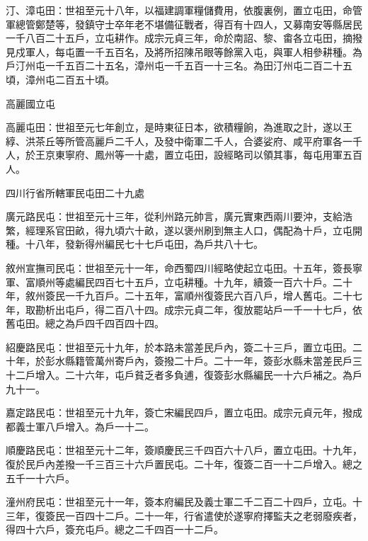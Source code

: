 \begin{pinyinscope}
 汀、漳屯田：世祖至元十八年，以福建調軍糧儲費用，依腹裏例，置立屯田，命管軍總管鄭楚等，發鎮守士卒年老不堪備征戰者，得百有十四人，又募南安等縣居民一千八百二十五戶，立屯耕作。成宗元貞三年，命於南詔、黎、畬各立屯田，摘撥見戍軍人，每屯置一千五百名，及將所招陳吊眼等餘黨入屯，與軍人相參耕種。為戶汀州屯一千五百二十五名，漳州屯一千五百一十三名。為田汀州屯二百二十五頃，漳州屯二百五十頃。



 高麗國立屯



 高麗屯田：世祖至元七年創立，是時東征日本，欲積糧餉，為進取之計，遂以王綧、洪茶丘等所管高麗戶二千人，及發中衛軍二千人，合婆娑府、咸平府軍各一千人，於王京東寧府、鳳州等一十處，置立屯田，設經略司以領其事，每屯用軍五百人。



 四川行省所轄軍民屯田二十九處



 廣元路民屯：世祖至元十三年，從利州路元帥言，廣元實東西兩川要沖，支給浩繁，經理系官田畝，得九頃六十畝，遂以褒州刷到無主人口，偶配為十戶，立屯開種。十八年，發新得州編民七十七戶屯田，為戶共八十七。



 敘州宣撫司民屯：世祖至元十一年，命西蜀四川經略使起立屯田。十五年，簽長寧軍、富順州等處編民四百七十五戶，立屯耕種。十九年，續簽一百六十戶。二十年，敘州簽民一千九百戶。二十五年，富順州復簽民六百八戶，增人舊屯。二十七年，取勘析出屯戶，得二百八十四。成宗元貞二年，復放罷站戶一千一十七戶，依舊屯田。總之為戶四千四百四十四。



 紹慶路民屯：世祖至元十九年，於本路未當差民戶內，簽二十三戶，置立屯田。二十年，於彭水縣籍管萬州寄戶內，簽撥二十戶。二十一年，簽彭水縣未當差民戶三十二戶增入。二十六年，屯戶貧乏者多負逋，復簽彭水縣編民一十六戶補之。為戶九十一。



 嘉定路民屯：世祖至元十九年，簽亡宋編民四戶，置立屯田。成宗元貞元年，撥成都義士軍八戶增入。為戶一十二。



 順慶路民屯：世祖至元十二年，簽順慶民三千四百六十八戶，置立屯田。十九年，復於民戶內差撥一千三百三十六戶置民屯。二十年，復簽二百一十二戶增入。總之五千一十六戶。



 潼州府民屯：世祖至元十一年，簽本府編民及義士軍二千二百二十四戶，立屯。十三年，復簽民一百四十二戶。二十一年，行省遣使於遂寧府擇監夫之老弱廢疾者，得四十六戶，簽充屯戶。總之二千四百一十二戶。




\end{pinyinscope}
